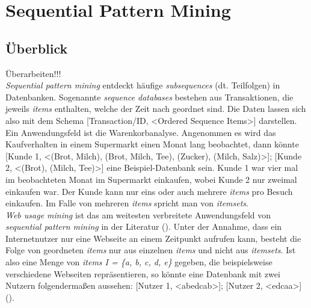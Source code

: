 \section{Sequential Pattern Mining}\label{spm}

\subsection{Überblick}

Überarbeiten!!!\\
\textit{Sequential pattern mining} entdeckt häufige \textit{subsequences} (dt. Teilfolgen) in Datenbanken. Sogenannte \textit{sequence databases} bestehen aus Transaktionen, die jeweils \textit{items} enthalten, welche der Zeit nach geordnet sind. Die Daten lassen sich also mit dem Schema [Transaction/ID, <Ordered Sequence Items>] darstellen.\\
Ein Anwendungsfeld ist die Warenkorbanalyse. Angenommen es wird das Kaufverhalten in einem Supermarkt einen Monat lang beobachtet, dann könnte [Kunde 1, <(Brot, Milch), (Brot, Milch, Tee), (Zucker), (Milch, Salz)>]; [Kunde 2, <(Brot), (Milch, Tee)>] eine Beispiel-Datenbank sein. Kunde 1 war vier mal im beobachteten Monat im Supermarkt einkaufen, wobei Kunde 2 nur zweimal einkaufen war. Der Kunde kann nur eins oder auch mehrere \textit{items} pro Besuch einkaufen. Im Falle von mehreren \textit{items} spricht man von \textit{itemsets}.\\
\textit{Web usage mining} ist das am weitesten verbreitete Anwendungsfeld von \textit{sequential pattern mining} in der Literatur (\cite{lu_ezeife,wang_han,goethals}). Unter der Annahme, dass ein Internetnutzer nur eine Webseite an einem Zeitpunkt aufrufen kann, besteht die Folge von geordneten \textit{items} nur aus einzelnen \textit{items} und nicht aus \textit{itemsets}. Ist also eine Menge von \textit{items I = \{a, b, c, d, e\}} gegeben, die beispielsweise verschiedene Webseiten repräsentieren, so könnte eine Datenbank mit zwei Nutzern folgendermaßen aussehen: [Nutzer 1, <abedcab>]; [Nutzer 2, <edcaa>] (\cite[3:1-3:2]{taxonomy}).

